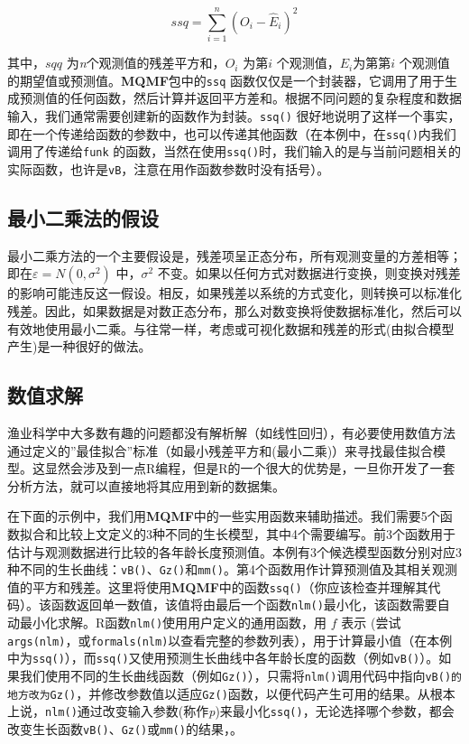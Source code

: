 \documentclass[
  lang=cn,
  11pt,
  scheme=chinese,
  chinesefont=nofont,
  citestyle=gb7714-2015,
  bibstyle=gb7714-2015]{elegantbook}
\begin{document}
\begin{equation}  
ssq=\sum\limits_{i=1}^{n}{{{\left( {{O}_{i}}-{\hat{E}_{i}} \right)}^{2}}}  
\label{eq:eq47}  
\end{equation}

其中，\(sqq\) 为\emph{n}个观测值的残差平方和，\(O_i\) 为第\(i\) 个观测值，\(E_i\)为第第\(i\) 个观测值的期望值或预测值。\textbf{MQMF}包中的\texttt{ssq} 函数仅仅是一个封装器，它调用了用于生成预测值的任何函数，然后计算并返回平方差和。根据不同问题的复杂程度和数据输入，我们通常需要创建新的函数作为封装。\texttt{ssq()} 很好地说明了这样一个事实，即在一个传递给函数的参数中，也可以传递其他函数（在本例中，在\texttt{ssq()}内我们调用了传递给\texttt{funk} 的函数，当然在使用\texttt{ssq()}时，我们输入的是与当前问题相关的实际函数，也许是\texttt{vB}，注意在用作函数参数时没有括号）。

\subsection{最小二乘法的假设}\label{ux6700ux5c0fux4e8cux4e58ux6cd5ux7684ux5047ux8bbe}

最小二乘方法的一个主要假设是，残差项呈正态分布，所有观测变量的方差相等；即在\(\varepsilon = N(0, \sigma^2)\) 中，\(\sigma^2\) 不变。如果以任何方式对数据进行变换，则变换对残差的影响可能违反这一假设。相反，如果残差以系统的方式变化，则转换可以标准化残差。因此，如果数据是对数正态分布，那么对数变换将使数据标准化，然后可以有效地使用最小二乘。与往常一样，考虑或可视化数据和残差的形式(由拟合模型产生)是一种很好的做法。

\subsection{数值求解}\label{ux6570ux503cux6c42ux89e3}

渔业科学中大多数有趣的问题都没有解析解（如线性回归），有必要使用数值方法通过定义的''最佳拟合''标准（如最小残差平方和(最小二乘)）来寻找最佳拟合模型。这显然会涉及到一点R编程，但是R的一个很大的优势是，一旦你开发了一套分析方法，就可以直接地将其应用到新的数据集。

在下面的示例中，我们用\textbf{MQMF}中的一些实用函数来辅助描述。我们需要5个函数拟合和比较上文定义的3种不同的生长模型，其中4个需要编写。前3个函数用于估计与观测数据进行比较的各年龄长度预测值。本例有3个候选模型函数分别对应3种不同的生长曲线：\texttt{vB()}、\texttt{Gz()}和\texttt{mm()}。第4个函数用作计算预测值及其相关观测值的平方和残差。这里将使用\textbf{MQMF}中的函数\texttt{ssq()}（你应该检查并理解其代码）。该函数返回单一数值，该值将由最后一个函数\texttt{nlm()}最小化，该函数需要自动最小化求解。R函数\texttt{nlm()}使用用户定义的通用函数，用 \(f\) 表示 (尝试\texttt{args(nlm)}，或\texttt{formals(nlm)}以查看完整的参数列表），用于计算最小值（在本例中为\texttt{ssq()}），而\texttt{ssq()}又使用预测生长曲线中各年龄长度的函数（例如\texttt{vB()}）。如果我们使用不同的生长曲线函数（例如\texttt{Gz()}），只需将\texttt{nlm()}调用代码中指向\texttt{vB()的地方改为Gz()}，并修改参数值以适应\texttt{Gz()}函数，以便代码产生可用的结果。从根本上说，\texttt{nlm()}通过改变输入参数(称作\emph{p})来最小化\texttt{ssq()}，无论选择哪个参数，都会改变生长函数\texttt{vB()}、\texttt{Gz()}或\texttt{mm()}的结果，。
\end{document}
